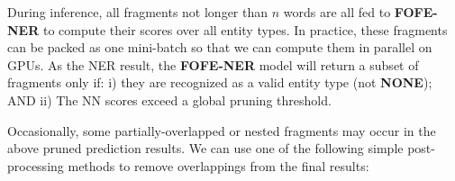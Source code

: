 \documentclass[11pt,a4paper]{article}
\begin{document}

During inference, all fragments not longer than $n$ words are all fed to {\bf FOFE-NER} to compute their scores over all entity types. In practice, these fragments can be packed as one mini-batch so that we can compute them in parallel on GPUs. As the NER result, the {\bf FOFE-NER} model will return a subset of fragments only if: i) they are recognized as a valid entity type (not {\bf NONE}); AND  ii) The NN scores exceed a global pruning threshold. 


Occasionally, some partially-overlapped or nested fragments may occur in the above pruned prediction results. We can use one of the following simple post-processing methods to remove overlappings from the final results:
\end{document}
